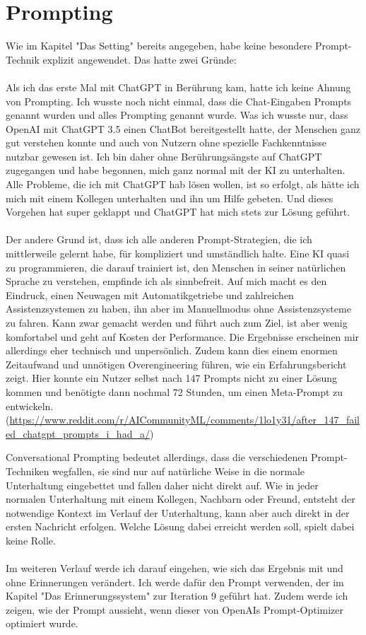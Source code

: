 	

\section*{Prompting}
Wie im Kapitel "Das Setting" bereits angegeben, habe keine besondere Prompt-Technik explizit angewendet. Das hatte zwei Gründe:\\
\\
Als ich das erste Mal mit ChatGPT in Berührung kam, hatte ich keine Ahnung von Prompting. Ich wusste noch nicht einmal, dass die Chat-Eingaben Prompts genannt wurden und alles Prompting genannt wurde. Was ich wusste nur, dass OpenAI mit ChatGPT 3.5 einen ChatBot bereitgestellt hatte, der Menschen ganz gut verstehen konnte und auch von Nutzern ohne spezielle Fachkenntnisse nutzbar gewesen ist. Ich bin daher ohne Berührungsängste auf ChatGPT zugegangen und habe begonnen, mich ganz normal mit der KI zu unterhalten. Alle Probleme, die ich mit ChatGPT hab lösen wollen, ist so erfolgt, als hätte ich mich mit einem Kollegen unterhalten und ihn um Hilfe gebeten. Und dieses Vorgehen hat super geklappt und ChatGPT hat mich stets zur Lösung geführt.\\
\\
Der andere Grund ist, dass ich alle anderen Prompt-Strategien, die ich mittlerweile gelernt habe, für kompliziert und umständlich halte. Eine KI quasi zu programmieren, die darauf trainiert ist, den Menschen in seiner natürlichen Sprache zu verstehen, empfinde ich als sinnbefreit. Auf mich macht es den Eindruck, einen Neuwagen mit Automatikgetriebe und zahlreichen Assistenzsystemen zu haben, ihn aber im Manuellmodus ohne Assistenzsysteme zu fahren. Kann zwar gemacht werden und führt auch zum Ziel, ist aber wenig komfortabel und geht auf Kosten der Performance. Die Ergebnisse erscheinen mir allerdings eher technisch und unpersönlich. Zudem kann dies einem enormen Zeitaufwand und unnötigen Overengineering führen, wie ein Erfahrungsbericht zeigt. Hier konnte ein Nutzer selbst nach 147 Prompts nicht zu einer Lösung kommen und benötigte dann nochmal 72 Stunden, um einen Meta-Prompt zu entwickeln. (\url{https://www.reddit.com/r/AICommunityML/comments/1lo1y31/after_147_failed_chatgpt_prompts_i_had_a/})

Conversational Prompting bedeutet allerdings, dass die verschiedenen Prompt-Techniken wegfallen, sie sind nur auf natürliche Weise in die normale Unterhaltung eingebettet und fallen daher nicht direkt auf. Wie in jeder normalen Unterhaltung mit einem Kollegen, Nachbarn oder Freund, entsteht der notwendige Kontext im Verlauf der Unterhaltung, kann aber auch direkt in der ersten Nachricht erfolgen. Welche Lösung dabei erreicht werden soll, spielt dabei keine Rolle.\\
\\
Im weiteren Verlauf werde ich darauf eingehen, wie sich das Ergebnis mit und ohne Erinnerungen verändert. Ich werde dafür den Prompt verwenden, der im Kapitel "Das Erinnerungssystem" zur Iteration 9 geführt hat. Zudem werde ich zeigen, wie der Prompt aussieht, wenn dieser von OpenAIs Prompt-Optimizer optimiert wurde.

